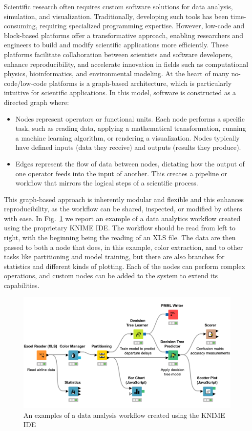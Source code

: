 \documentclass[a4paper,12pt]{article}
\begin{document}
Scientific research often requires custom software solutions for data analysis, simulation, and visualization. Traditionally, developing such tools has been time-consuming, requiring specialized programming expertise. However, low-code and block-based platforms offer a transformative approach, enabling researchers and engineers to build and modify scientific applications more efficiently. These platforms facilitate collaboration between scientists and software developers, enhance reproducibility, and accelerate innovation in fields such as computational physics, bioinformatics, and environmental modeling.
At the heart of many no-code/low-code platforms is a graph-based architecture, which is particularly intuitive for scientific applications. In this model, software is constructed as a directed graph where:

\begin{itemize}
\item Nodes represent operators or functional units. Each node performs a specific task, such as reading data, applying a mathematical transformation, running a machine learning algorithm, or rendering a visualization. Nodes typically have defined inputs (data they receive) and outputs (results they produce).

\item Edges represent the flow of data between nodes, dictating how the output of one operator feeds into the input of another. This creates a pipeline or workflow that mirrors the logical steps of a scientific process.
\end{itemize}

This graph-based approach is inherently modular and flexible and this enhances reproducibility, as the workflow can be shared, inspected, or modified by others with ease.
In Fig.~\ref{nocode-data} we report an example of a data analytics workflow created using the proprietary KNIME IDE. The workflow should be read from left to right, with the beginning being the reading of an XLS file. The data are then passed to both a node that does, in this example, color extraction, and to other tasks like partitioning and model training, but there are also branches for statistics and different kinds of plotting. Each of the nodes can perform complex operations, and custom nodes can be added to the system to extend its capabilities. 
\begin{figure}
\includegraphics[width=400pt]{nocode-data.png}
\caption{An examples of a data analysis workflow created using the KNIME IDE}
\label{nocode-data}
\end{figure}
\end{document}
